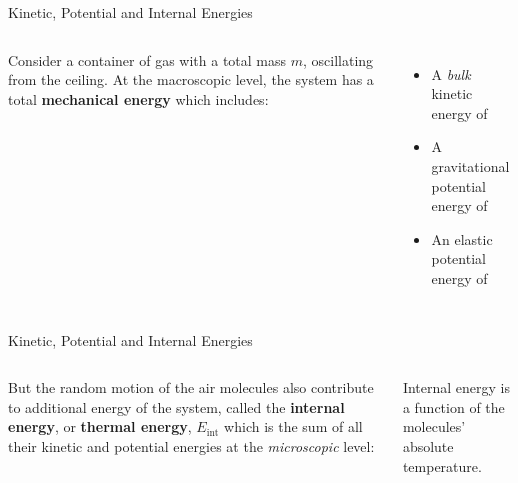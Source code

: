 \documentclass[12pt,aspectratio=169,dvipsnames]{beamer}
\begin{document}
\begin{frame}[t]{Kinetic, Potential and Internal Energies}
  \begin{columns}[T]
    

    Consider a container of gas with a total mass $m$, oscillating from the
    ceiling. At the macroscopic level, the system has a total
    \textbf{mechanical energy} which includes:
    \begin{itemize}
    \item A \emph{bulk} kinetic energy of


    \item\vspace{-.1in}A gravitational potential energy of


    \item\vspace{-.18in} An elastic potential energy of

    \end{itemize}
  \end{columns}
\end{frame}



\begin{frame}[t]{Kinetic, Potential and Internal Energies}
  \begin{columns}[T]
    

    But the random motion of the air molecules also contribute to additional
    energy of the system, called the \textbf{internal energy}, or
    \textbf{thermal energy}, $E_\text{int}$ which is the sum of all their
    kinetic and potential energies at the \emph{microscopic} level:


    Internal energy is a function of the molecules' absolute temperature.
  \end{columns}
\end{frame}
\end{document}
